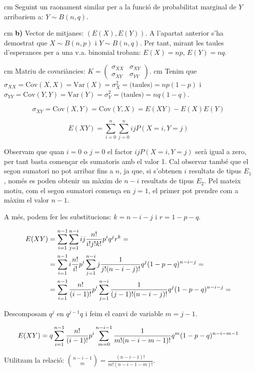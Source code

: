 \documentclass{article}
\begin{document}
 cm
\noindent
Seguint un raonament similar per a la funci\'o de probabilitat marginal de $Y$ 
arribariem a: $Y \sim B(n, q)$.

 cm
\noindent
\textbf{b)} 
Vector de mitjanes: $(E(X), E(Y))$. A l'apartat anterior s'ha demostrat que $X \sim B(n, p)$ 
i $Y \sim B(n, q)$. Per tant, mirant les taules d'esperances per a una v.a. binomial trobam:
$E(X)=n p$, $E(Y)=nq$.

 cm
Matriu de covari\`ancies: 
$K=\begin{pmatrix} \sigma_{XX} & \sigma_{XY} \\ \sigma_{XY} & \sigma_{YY} \end{pmatrix}$.
 cm
Tenim que $\sigma_{XX}=\mathrm{Cov}(X, X)=\mathrm{Var}(X)=\sigma_X^2=\text{(taules)}=np(1-p)$ i
$\sigma_{YY}=\mathrm{Cov}(Y, Y)=\mathrm{Var}(Y)=\sigma_Y^2=\text{(taules)}=nq(1-q)$. 

$$\sigma_{XY}=\mathrm{Cov}(X, Y)=\mathrm{Cov}(Y, X)=E(XY)-E(X)E(Y)$$

\[
E(XY)=\sum_{i=0}^n \sum_{j=0}^n i j P(X=i, Y=j)
\]

Observam que quan $i=0$ o $j=0$ el factor $i j P(X=i, Y=j)$ ser\`a igual a zero, per tant basta comen\c{c}ar els
sumatoris amb el valor 1. Cal observar tamb\'e que el segon sumatori no pot arribar fins a $n$, ja que, si s'obtenen $i$
resultats de tipus $E_1$, nom\'es es poden obtenir un m\`axim de $n-i$ resultats de tipus $E_2$. 
Pel mateix motiu, com el segon sumatori comen\c{c}a en $j=1$, el primer pot prendre com a m\`axim el valor $n-1$.

A m\'es, podem fer les substitucions: $k=n-i-j$ i $r=1-p-q$. 

\[
\begin{split}
E(XY) & = \sum_{i=1}^{n-1} \sum_{j=1}^{n-i} i j {n! \over i!  j!  k!}  p^i  q^j  r^k = \\ 
&= \sum_{i=1}^{n-1} i {n! \over i!} p^i \sum_{j=1}^{n-i} j {1 \over j! (n-i-j)!} q^j  (1-p-q)^{n-i-j} = \\ 
&= \sum_{i=1}^{n-1} {n! \over (i-1)!} p^i \sum_{j=1}^{n-i} {1 \over (j-1)! (n-i-j)!} q^j  (1-p-q)^{n-i-j} =
\end{split}
\]

Descomposam $q^j$ en $q^{j-1} q$ i feim el canvi de variable $m=j-1$. 

\[
E(XY)= q \sum_{i=1}^{n-1} {n! \over (i-1)!} p^i \sum_{m=0}^{n-i-1} {1 \over m! (n-i-m-1)!} q^m  (1-p-q)^{n-i-m-1}
\]

Utilitzam la relaci\'o: $\binom{n-i-1}{m}=\frac{(n-i-1)!}{m! (n-i-1-m)!}$.
\end{document}

